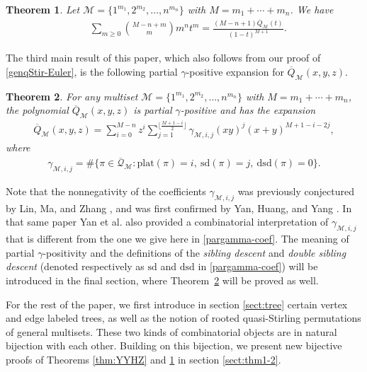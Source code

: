 \documentclass[11pt,reqno]{amsart}
\numberwithin{equation}{section}
\theoremstyle{plain}
\newtheorem{theorem}{Theorem}[section]
\theoremstyle{definition}
\newcommand{\bQ}{\overline{\mathcal{Q}}}
\newcommand{\M}{\mathcal{M}}
\def\plat{\mathrm{plat}}
\def\sdes{\mathrm{sd}}
\def\sddes{\mathrm{dsd}}
\begin{document}
\begin{theorem}\label{thm:YZ}
Let $\M=\{1^{m_1},2^{m_2},\ldots,n^{m_n}\}$ with $M=m_1+\cdots+m_n$. We have
\begin{align}
\label{numerator:genqStir}
& \sum_{m\ge 0}\binom{M-n+m}{m}m^n t^m = \frac{(M-n+1)\overline{Q}_{\M}(t)}{(1-t)^{M+1}}.
\end{align}
\end{theorem}

The third main result of this paper, which also follows from our proof of \eqref{genqStir-Euler}, is the following partial $\gamma$-positive expansion for $\overline{Q}_{\M}(x,y,z)$. 

\begin{theorem}\label{thm:pargamma}
For any multiset $\M=\{1^{m_1},2^{m_2},\ldots,n^{m_n}\}$ with $M=m_1+\cdots+m_n$, the polynomial $\overline{Q}_{\M}(x,y,z)$ is partial $\gamma$-positive and has the expansion
\begin{align}\label{pargamma of quasiStir}
\overline{Q}_{\M}(x,y,z)=\sum_{i=0}^{M-n}z^i\sum_{j=1}^{\lfloor\frac{M+1-i}{2}\rfloor}\gamma_{\M,i,j}(xy)^j(x+y)^{M+1-i-2j},
\end{align}
where
\begin{align}\label{pargamma-coef}
\gamma_{\M,i,j}=\#\{\pi\in\bQ_{\M}:\plat(\pi)=i,~\sdes(\pi)=j,~\sddes(\pi)=0\}.
\end{align}
\end{theorem}

Note that the nonnegativity of the coefficients $\gamma_{\M,i,j}$ was previously conjectured by Lin, Ma, and Zhang \cite{LMZ}, and was first confirmed by Yan, Huang, and Yang \cite{YHY}. In that same paper Yan et al. also provided a combinatorial interpretation of $\gamma_{\M,i,j}$ that is different from the one we give here in \eqref{pargamma-coef}. The meaning of partial $\gamma$-positivity and the definitions of the {\em sibling descent} and {\em double sibling descent} (denoted respectively as $\sdes$ and $\sddes$ in \eqref{pargamma-coef}) will be introduced in the final section, where Theorem~\ref{thm:pargamma} will be proved as well. 

For the rest of the paper, we first introduce in section \ref{sect:tree} certain vertex and edge labeled trees, as well as the notion of rooted quasi-Stirling permutations of general multisets. These two kinds of combinatorial objects are in natural bijection with each other. Building on this bijection, we present new bijective proofs of Theorems \ref{thm:YYHZ} and \ref{thm:YZ} in section \ref{sect:thm1-2}.
\end{document}
